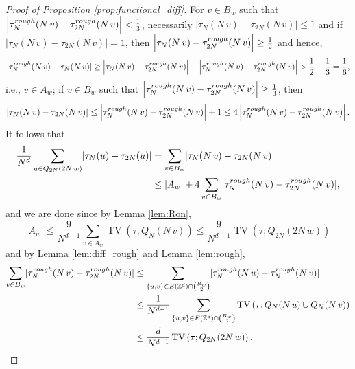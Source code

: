 \documentclass[10pt,a4paper]{amsart}
\DeclareMathOperator{\TV}{TV}
\newcommand{\Z}{\mathbb{Z}}
\begin{document}
\begin{proof}[Proof of Proposition \ref{prop:functional_diff}]
For $v\in B_w$ such that $\left\lvert\tau^{\rm rough}_N(N\,v)-\tau^{\rm rough}_{2N}(N\,v)\right\rvert<\frac{1}{3}$, necessarily $\left\lvert\tau_N(N\,v)-\tau_{2N}(N\,v)\right\rvert\leq 1$ and if 
$\left\lvert\tau_N(N\,v)-\tau_{2N}(N\,v)\right\rvert=1$, then $\left\lvert\tau_N(N\,v)-\tau^{\rm rough}_{2N}(N\,v)\right\rvert\geq\frac{1}{2}$ and hence,
$$
\lvert\tau^{\rm rough}_N(N\,v)-\tau_N(N\,v)\rvert\geq \left\lvert\tau_N(N\,v)-\tau^{\rm rough}_{2N}(N\,v)\right\rvert-\left\lvert\tau^{\rm rough}_N(N\,v)-\tau^{\rm rough}_{2N}(N\,v)\right\rvert>\frac{1}{2}-\frac{1}{3}=\frac{1}{6},
$$
i.e., $v\in A_w$;
if $v\in B_w$ such that
$\left\lvert\tau^{\rm rough}_N(N\,v)-\tau^{\rm rough}_{2N}(N\,v)\right\rvert\geq\frac{1}{3}$, then 
$$
\left\lvert\tau_N(N\,v)-\tau_{2N}(N\,v)\right\rvert\leq \left\lvert\tau^{\rm rough}_N(N\,v)-\tau^{\rm rough}_{2N}(N\,v)\right\rvert+1\leq 4\left\lvert\tau^{\rm rough}_N(N\,v)-\tau^{\rm rough}_{2N}(N\,v)\right\rvert.$$
It follows that
\begin{align*}
\frac{1}{N^d}\sum_{u\in Q_{2N}(2N\,w)}\lvert\tau_N(u)-\tau_{2N}(u)\rvert&=
\sum_{v\in B_w}\lvert\tau_N(N\,v)-\tau_{2N}(N\,v)\rvert\\
&\leq \lvert A_w\rvert+
4\sum_{v\in B_w}\lvert\tau^{\rm rough}_N(N\,v)-\tau^{\rm rough}_{2N}(N\,v)\rvert,
\end{align*}
and we are done since by Lemma \ref{lem:Ron}, $$\lvert A_w\rvert\leq \frac{9}{N^{d-1}}\sum_{v\in A_w}\TV\left(\tau; Q_N(N\,v)\right)\leq \frac{9}{N^{d-1}}\TV\left(\tau; Q_{2N}(2N\,w)\right)$$
and by Lemma \ref{lem:diff_rough} and Lemma \ref{lem:rough}, 
\begin{align*}
\sum_{v\in B_w}\lvert\tau^{\rm rough}_N(N\,v)-\tau^{\rm rough}_{2N}(N\,v)\rvert&\leq\sum_{\{u,v\}\in E(\Z^d)\cap\binom{B_w}{2}}\lvert\tau^{\rm rough}_N(N\,u)-\tau^{\rm rough}_N(N\,v)\rvert\\
&\leq \frac{1}{N^{d-1}}\sum_{\{u,v\}\in E(\Z^d)\cap\binom{B_w}{2}}\TV\left(\tau; Q_N(N\,u)\cup Q_N(N\,v)\right)\\
&\leq \frac{d}{N^{d-1}}\TV\left(\tau; Q_{2N}(2N\,w)\right).\qedhere\end{align*}
\end{proof}
\end{document}
